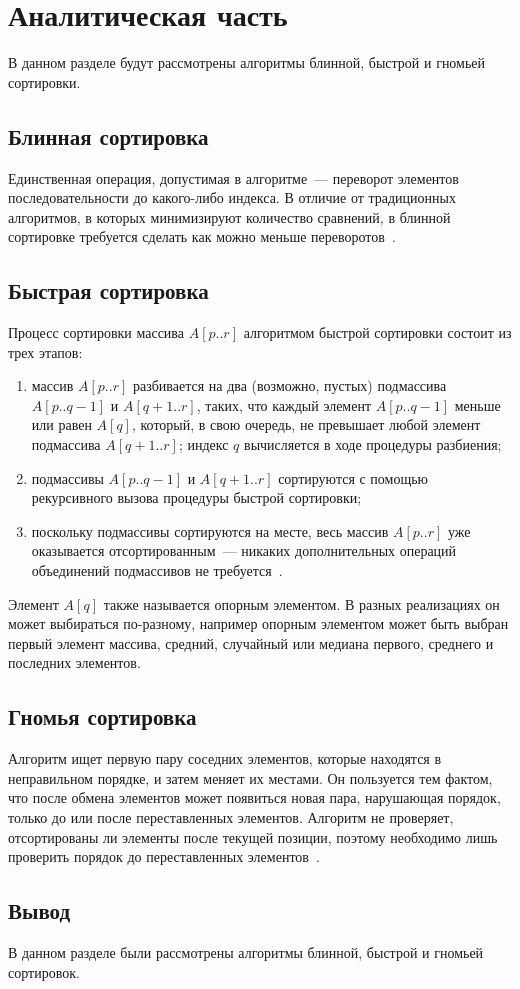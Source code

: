 \chapter{Аналитическая часть}

В данном разделе будут рассмотрены алгоритмы блинной, быстрой и гномьей сортировки.

\section{Блинная сортировка}

Единственная операция, допустимая в алгоритме~--- переворот элементов последовательности до какого-либо индекса.
В отличие от традиционных алгоритмов, в которых минимизируют количество сравнений, в блинной сортировке требуется сделать как можно меньше переворотов~\cite{pancake-sort}.

\section{Быстрая сортировка}

Процесс сортировки массива $A[p..r]$ алгоритмом быстрой сортировки состоит из трех этапов:
\begin{enumerate}
    \item массив $A[p..r]$ разбивается на два (возможно, пустых) подмассива $A[p..q-1]$ и $A[q+1..r]$, таких, что каждый элемент $A[p..q-1]$ меньше или равен $A[q]$, который, в свою очередь, не превышает любой элемент подмассива $A[q+1..r]$; индекс $q$ вычисляется в ходе процедуры разбиения;
    \item подмассивы $A[p..q-1]$ и $A[q+1..r]$ сортируются с помощью рекурсивного вызова процедуры быстрой сортировки;
    \item поскольку подмассивы сортируются на месте, весь массив $A[p..r]$ уже оказывается отсортированным~--- никаких дополнительных операций объединений подмассивов не требуется~\cite{qsort-book}.
\end{enumerate}

Элемент $A[q]$ также называется опорным элементом. 
В разных реализациях он может выбираться по-разному, например опорным элементом может быть выбран первый элемент массива, средний, случайный или медиана первого, среднего и последних элементов.

\section{Гномья сортировка}

Алгоритм ищет первую пару соседних элементов, которые находятся в неправильном порядке, и затем меняет их местами. 
Он пользуется тем фактом, что после обмена элементов может появиться новая пара, нарушающая порядок, только до или после переставленных элементов.
Алгоритм не проверяет, отсортированы ли элементы после текущей позиции, поэтому необходимо лишь проверить порядок до переставленных элементов~\cite{gnome-sort}.

\section*{Вывод}

В данном разделе были рассмотрены алгоритмы блинной, быстрой и гномьей сортировок.